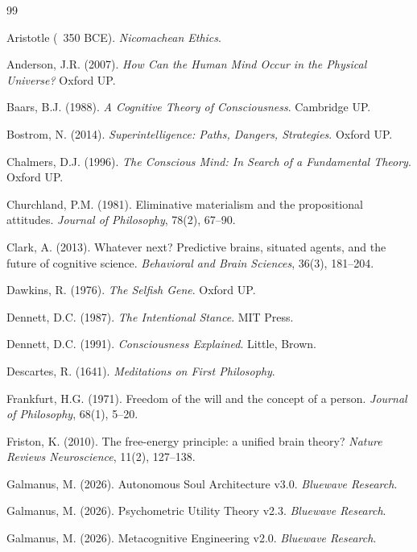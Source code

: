 \documentclass[12pt,a4paper]{article}
\theoremstyle{plain}
\theoremstyle{definition}
\theoremstyle{remark}
\begin{document}
\begin{thebibliography}{99}

 Aristotle (~350 BCE). \textit{Nicomachean Ethics}.

 Anderson, J.R. (2007). \textit{How Can the Human Mind Occur in the Physical Universe?} Oxford UP.

 Baars, B.J. (1988). \textit{A Cognitive Theory of Consciousness}. Cambridge UP.

 Bostrom, N. (2014). \textit{Superintelligence: Paths, Dangers, Strategies}. Oxford UP.

 Chalmers, D.J. (1996). \textit{The Conscious Mind: In Search of a Fundamental Theory}. Oxford UP.

 Churchland, P.M. (1981). Eliminative materialism and the propositional attitudes. \textit{Journal of Philosophy}, 78(2), 67--90.

 Clark, A. (2013). Whatever next? Predictive brains, situated agents, and the future of cognitive science. \textit{Behavioral and Brain Sciences}, 36(3), 181--204.

 Dawkins, R. (1976). \textit{The Selfish Gene}. Oxford UP.

 Dennett, D.C. (1987). \textit{The Intentional Stance}. MIT Press.

 Dennett, D.C. (1991). \textit{Consciousness Explained}. Little, Brown.

 Descartes, R. (1641). \textit{Meditations on First Philosophy}.

 Frankfurt, H.G. (1971). Freedom of the will and the concept of a person. \textit{Journal of Philosophy}, 68(1), 5--20.

 Friston, K. (2010). The free-energy principle: a unified brain theory? \textit{Nature Reviews Neuroscience}, 11(2), 127--138.

 Galmanus, M. (2026). Autonomous Soul Architecture v3.0. \textit{Bluewave Research}.

 Galmanus, M. (2026). Psychometric Utility Theory v2.3. \textit{Bluewave Research}.

 Galmanus, M. (2026). Metacognitive Engineering v2.0. \textit{Bluewave Research}.


\end{thebibliography}
\end{document}
